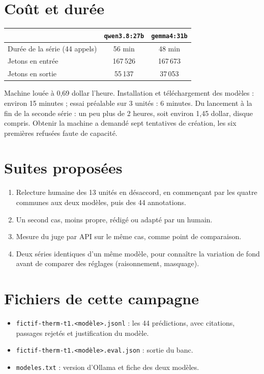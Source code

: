 \documentclass[11pt,a4paper]{article}
\begin{document}
\section{Coût et durée}

\begin{center}
\begin{tabular}{@{}lcc@{}}
\toprule
 & \texttt{qwen3.8:27b} & \texttt{gemma4:31b} \\
\midrule
Durée de la série (44 appels) & 56 min & 48 min \\
Jetons en entrée & 167\,526 & 167\,673 \\
Jetons en sortie & 55\,137 & 37\,053 \\
\bottomrule
\end{tabular}
\end{center}

Machine louée à 0,69 dollar l'heure. Installation et téléchargement des
modèles : environ 15 minutes ; essai préalable sur 3 unités : 6 minutes.
Du lancement à la fin de la seconde série : un peu plus de 2 heures, soit
environ 1,45 dollar, disque compris. Obtenir la machine a demandé sept
tentatives de création, les six premières refusées faute de capacité.

\section{Suites proposées}

\begin{enumerate}
\item Relecture humaine des 13 unités en désaccord, en commençant par les
  quatre communes aux deux modèles, puis des 44 annotations.
\item Un second cas, moins propre, rédigé ou adapté par un humain.
\item Mesure du juge par API sur le même cas, comme point de comparaison.
\item Deux séries identiques d'un même modèle, pour connaître la variation
  de fond avant de comparer des réglages (raisonnement, masquage).
\end{enumerate}

\section*{Fichiers de cette campagne}

\begin{itemize}
\item \texttt{fictif-therm-t1.<modèle>.jsonl} : les 44 prédictions, avec
  citations, passages rejetés et justification du modèle.
\item \texttt{fictif-therm-t1.<modèle>.eval.json} : sortie du banc.
\item \texttt{modeles.txt} : version d'Ollama et fiche des deux modèles.
\end{itemize}
\end{document}
